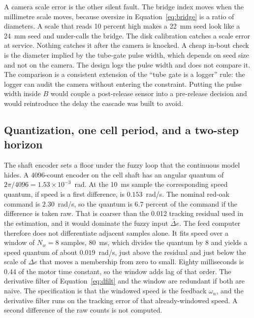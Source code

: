 A camera scale error is the other silent fault. The bridge index moves when the millimetre scale moves, because oversize in Equation~\eqref{eq:bridge} is a ratio of diameters. A scale that reads 10 percent high makes a 22~mm seed look like a 24~mm seed and under-calls the bridge. The disk calibration catches a scale error at service. Nothing catches it after the camera is knocked. A cheap in-bout check is the diameter implied by the tube-gate pulse width, which depends on seed size and not on the camera. The design logs the pulse width and does not compare it. The comparison is a consistent extension of the ``tube gate is a logger'' rule: the logger can audit the camera without entering the constraint. Putting the pulse width inside $B$ would couple a post-release sensor into a pre-release decision and would reintroduce the delay the cascade was built to avoid.

\subsection{Quantization, one cell period, and a two-step horizon}

The shaft encoder sets a floor under the fuzzy loop that the continuous model hides. A 4096-count encoder on the cell shaft has an angular quantum of $2\pi/4096=1.53\times 10^{-3}$~rad. At the 10~ms sample the corresponding speed quantum, if speed is a first difference, is $0.153$~rad/s. The nominal red-oak command is $2.30$~rad/s, so the quantum is 6.7 percent of the command if the difference is taken raw. That is coarser than the 0.012 tracking residual used in the estimation, and it would dominate the fuzzy input $\widetilde{\Delta e}$. The feed computer therefore does not differentiate adjacent samples alone. It fits speed over a window of $N_w=8$ samples, 80~ms, which divides the quantum by 8 and yields a speed quantum of about $0.019$~rad/s, just above the residual and just below the scale of $\Delta e$ that moves a membership from zero to small. Eighty milliseconds is 0.44 of the motor time constant, so the window adds lag of that order. The derivative filter of Equation~\eqref{eq:dfilt} and the window are redundant if both are naive. The specification is that the windowed speed is the feedback $\omega_n$, and the derivative filter runs on the tracking error of that already-windowed speed. A second difference of the raw counts is not computed.

